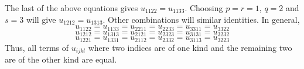 \begin{itemize}
\begin{enumerate}
The last of the above equations gives $u_{1122} = u_{1133}$. Choosing $p = r = 1$, $q = 2$ and $s = 3$ will give $u_{1212} = u_{1313}$. Other combinations will similar identities. In
general,
\begin{equation}\label{mr12e5}
u_{1122} = u_{1133} = u_{2211} = u_{2233} = u_{3311} = u_{3322}
\end{equation}
\begin{equation}\label{mr12e6}
u_{1212} = u_{1313} = u_{2121} = u_{2323} = u_{3131} = u_{3232}
\end{equation}
\begin{equation}\label{mr12e7}
u_{1221} = u_{1331} = u_{2112} = u_{2332} = u_{3113} = u_{3223}
\end{equation}
Thus, all terms of $u_{ijkl}$ where two indices are of one kind and the remaining two are of the other kind are equal.


\end{enumerate}
\end{itemize}
